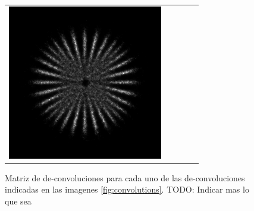 \documentclass{./packages/optica-article}
\begin{document}
\begin{figure}
\begin{tabular}[t]{l c c c c}
		\includegraphics[scale=0.25]{Simulation deconvolution/ref_np_0.01/RL_50.png}
		\\
	\end{tabular}
	\caption{Matriz de de-convoluciones para cada uno de las de-convoluciones indicadas en las imagenes \ref{fig:convolutions}.
		TODO: Indicar mas lo que sea
	}
\end{figure}



\end{document}
